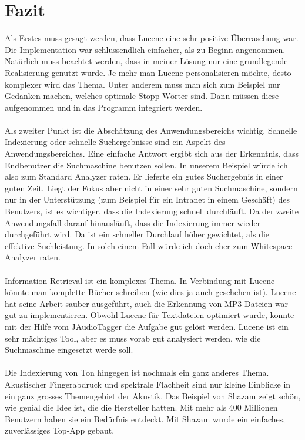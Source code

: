 \documentclass[12pt,a4paper,ngerman]{report}
\begin{document}
\chapter{Fazit}
Als Erstes muss gesagt werden, dass Lucene eine sehr positive Überraschung war. Die Implementation war schlussendlich einfacher, als zu Beginn angenommen. Natürlich muss beachtet werden, dass in meiner Lösung nur eine grundlegende Realisierung genutzt wurde. Je mehr man Lucene personalisieren möchte, desto komplexer wird das Thema. Unter anderem muss man sich zum Beispiel nur Gedanken machen, welches optimale Stopp-Wörter sind. Dann müssen diese aufgenommen und in das Programm integriert werden.\\
\\
Als zweiter Punkt ist die Abschätzung des Anwendungsbereichs wichtig. Schnelle Indexierung oder schnelle Suchergebnisse sind ein Aspekt des Anwendungsbereiches. Eine einfache Antwort ergibt sich aus der Erkenntnis, dass Endbenutzer die Suchmaschine benutzen sollen. In unserem Beispiel würde ich also zum Standard Analyzer raten. Er lieferte ein gutes Suchergebnis in einer guten Zeit. Liegt der Fokus aber nicht in einer sehr guten Suchmaschine, sondern nur in der Unterstützung (zum Beispiel für ein Intranet in einem Geschäft) des Benutzers, ist es wichtiger, dass die Indexierung schnell durchläuft. Da der zweite Anwendungsfall darauf hinausläuft, dass die Indexierung immer wieder durchgeführt wird. Da ist ein schneller Durchlauf höher gewichtet, als die effektive Suchleistung. In solch einem Fall würde ich doch eher zum Whitespace Analyzer raten.\\
\\
Information Retrieval ist ein komplexes Thema. In Verbindung mit Lucene könnte man komplette Bücher schreiben (wie dies ja auch geschehen ist). Lucene hat seine Arbeit sauber ausgeführt, auch die Erkennung von MP3-Dateien war gut zu implementieren. Obwohl Lucene  für Textdateien optimiert wurde, konnte mit der Hilfe vom JAudioTagger die Aufgabe gut gelöst werden. Lucene ist ein sehr mächtiges Tool,  aber es muss vorab gut analysiert werden, wie die Suchmaschine eingesetzt werde soll.\\
\\
Die Indexierung von Ton hingegen ist nochmals ein ganz anderes Thema. Akustischer Fingerabdruck und spektrale Flachheit sind nur kleine Einblicke in ein ganz grosses Themengebiet der Akustik. Das Beispiel von Shazam zeigt schön, wie genial die Idee ist, die die Hersteller  hatten. Mit mehr als 400 Millionen Benutzern haben sie ein Bedürfnis entdeckt. Mit Shazam wurde ein einfaches, zuverlässiges Top-App gebaut.
\end{document}
